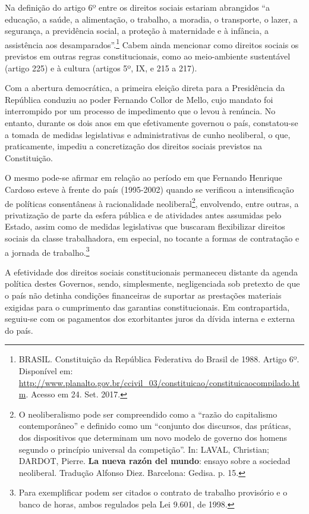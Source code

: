 Na definição do artigo 6º entre os direitos sociais estariam abrangidos
``a educação, a saúde, a alimentação, o trabalho, a moradia, o
transporte, o lazer, a segurança, a previdência social, a proteção à
maternidade e à infância, a assistência aos desamparados''.\footnote{BRASIL.
  Constituição da República Federativa do Brasil de 1988. Artigo 6º.
  Disponível em:
  \url{http://www.planalto.gov.br/ccivil_03/constituicao/constituicaocompilado.htm}.
  Acesso em 24. Set. 2017.} Cabem ainda mencionar como direitos sociais
os previstos em outras regras constitucionais, como ao meio-ambiente
sustentável (artigo 225) e à cultura (artigos 5º, IX, e 215 a 217).

Com a abertura democrática, a primeira eleição direta para a Presidência
da República conduziu ao poder Fernando Collor de Mello, cujo mandato
foi interrompido por um processo de impedimento que o levou à renúncia.
No entanto, durante os dois anos em que efetivamente governou o país,
constatou-se a tomada de medidas legislativas e administrativas de cunho
neoliberal, o que, praticamente, impediu a concretização dos direitos
sociais previstos na Constituição.

O mesmo pode-se afirmar em relação ao período em que Fernando Henrique
Cardoso esteve à frente do país (1995-2002) quando se verificou a
intensificação de políticas consentâneas à racionalidade
neoliberal\footnote{O neoliberalismo pode ser compreendido como a
  ``razão do capitalismo contemporâneo'' e definido como um ``conjunto
  dos discursos, das práticas, dos dispositivos que determinam um novo
  modelo de governo dos homens segundo o princípio universal da
  competição''. In: LAVAL, Christian; DARDOT, Pierre. \textbf{La nueva
  razón del mundo}: ensayo sobre a sociedad neoliberal. Tradução Alfonso
  Diez. Barcelona: Gedisa. p. 15.}, envolvendo, entre outras, a
privatização de parte da esfera pública e de atividades antes assumidas
pelo Estado, assim como de medidas legislativas que buscaram
flexibilizar direitos sociais da classe trabalhadora, em especial, no
tocante a formas de contratação e a jornada de trabalho.\footnote{Para
  exemplificar podem ser citados o contrato de trabalho provisório e o
  banco de horas, ambos regulados pela Lei 9.601, de 1998.}

A efetividade dos direitos sociais constitucionais permaneceu distante
da agenda política destes Governos, sendo, simplesmente, negligenciada
sob pretexto de que o país não detinha condições financeiras de suportar
as prestações materiais exigidas para o cumprimento das garantias
constitucionais. Em contrapartida, seguiu-se com os pagamentos dos
exorbitantes juros da dívida interna e externa do país.

